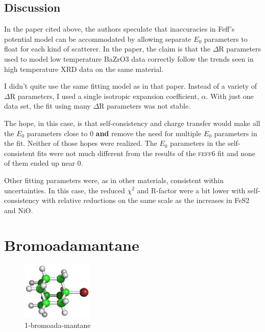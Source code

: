 \documentclass[11pt]{article}
\begin{document}
\subsection{Discussion}
\label{sec:orgheadline30}

In the paper cited above, the authors speculate that inaccuracies in
Feff's potential model can be accommodated by allowing separate $E_0$
parameters to float for each kind of scatterer. In the paper, the claim
is that the $\Delta$R parameters used to model low temperature BaZrO3 data
correctly follow the trends seen in high temperature XRD data on the
same material.

I didn't quite use the same fitting model as in that paper. Instead of a
variety of $\Delta$R parameters, I used a single isotropic expansion
coefficient, $\alpha$. With just one data set, the fit using many $\Delta$R parameters
was not stable.

The hope, in this case, is that self-consistency and charge transfer
would make all the $E_0$ parameters close to 0 \textbf{and} remove the need for
multiple $E_0$ parameters in the fit. Neither of those hopes were realized.
The $E_0$ parameters in the self-consistent fits were not much different
from the results of the \textsc{feff6} fit and none of them ended up near 0.

Other fitting parameters were, as in other materials, consistent within
uncertainties. In this case, the reduced $\chi^2$ and R-factor were a bit
lower with self-consistency with relative reductions on the same scale
as the increases in FeS2 and NiO.


\section{Bromoadamantane}
\label{sec:orgheadline37}


\begin{figure}
  \begin{center}
    \includegraphics[width=0.3\textwidth]{bromoadamantane/bromoadamantane.png}
  \end{center}
  \caption{1-bromoada-mantane}
\end{figure}
\end{document}
